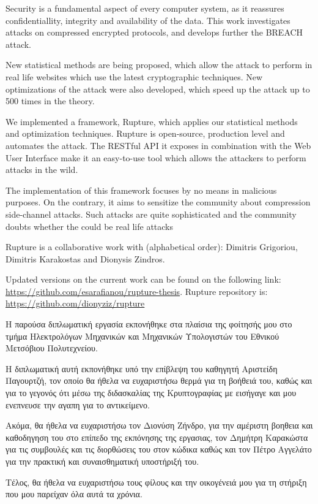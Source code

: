 \begin{abstracten}

Security is a fundamental aspect of every computer system, as it reassures
 confidentiallity, integrity and availability of the data. This work investigates
attacks on compressed encrypted protocols, and develops further the BREACH attack.

New statistical methods are being proposed, which allow the attack to perform in real life websites
which use the latest cryptographic techniques. New optimizations of the attack were also developed, which speed
up the attack up to 500 times in the theory.

We implemented a framework, Rupture, which applies our statistical methods and 
optimization techniques. Rupture is open-source, production level and automates the attack.
The RESTful API it exposes in combination with the Web User Interface make it an easy-to-use tool 
which allows the attackers to perform attacks in the wild.

The implementation of this framework focuses by no means in malicious purposes. On the contrary,
it aims to sensitize the community about compression side-channel attacks. Such attacks are quite 
sophisticated and the community doubts whether the could be real life attacks

Rupture is a collaborative work with (alphabetical order): Dimitris Grigoriou, Dimitris Karakostas
and Dionysis Zindros.

Updated versions on the current work can be found on the following link:
\url{https://github.com/esarafianou/rupture-thesis}. Rupture repository is:
\url{https://github.com/dionyziz/rupture}

\end{abstracten}

\begin{acknowledgementsgr}
Η παρούσα διπλωματική εργασία εκπονήθηκε στα πλαίσια της φοίτησής μου στο τμήμα
Ηλεκτρολόγων Μηχανικών και Μηχανικών Υπολογιστών του Εθνικού Μετσόβιου
Πολυτεχνείου.

Η διπλωματική αυτή εκπονήθηκε υπό την επίβλεψη του καθηγητή Αριστείδη Παγουρτζή,
τον οποίο θα ήθελα να ευχαριστήσω θερμά για τη βοήθειά του, καθώς και για το
γεγονός ότι μέσω της διδασκαλίας της Κρυπτογραφίας με εισήγαγε
και μου ενεπνευσε την αγαπη για το αντικείμενο.

Ακόμα, θα ήθελα να ευχαριστήσω τον Διονύση Ζήνδρο, για την αμέριστη βοηθεια και καθοδηγηση του
στο επίπεδο της εκπόνησης της εργασιας, τον Δημήτρη Καρακώστα για τις συμβουλές και
τις διορθώσεις του στον κώδικα καθώς και τον Πέτρο Αγγελάτο για την πρακτική και συναισθηματική υποστήριξή του.

Τέλος, θα ήθελα να ευχαριστήσω τους φίλους και την οικογένειά μου για τη στήριξη
που μου παρείχαν όλα αυτά τα χρόνια.

\end{acknowledgementsgr}
